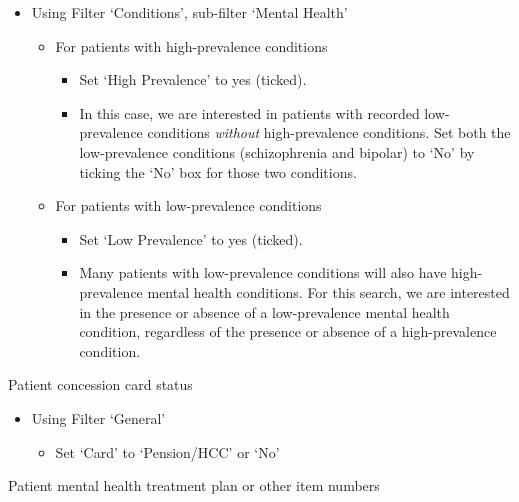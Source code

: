 \documentclass[
  letterpaper,
  DIV=11,
  numbers=noendperiod,
  oneside]{scrartcl}
\providecommand{\tightlist}{%
  \setlength{\itemsep}{0pt}\setlength{\parskip}{0pt}}\usepackage{longtable,booktabs,array}
\begin{document}
\begin{itemize}
\tightlist
\item
  Using Filter `Conditions', sub-filter `Mental Health'

  \begin{itemize}
  \tightlist
  \item
    For patients with high-prevalence conditions

    \begin{itemize}
    \tightlist
    \item
      Set `High Prevalence' to yes (ticked).
    \item
      In this case, we are interested in patients with recorded
      low-prevalence conditions \emph{without} high-prevalence
      conditions. Set both the low-prevalence conditions (schizophrenia
      and bipolar) to `No' by ticking the `No' box for those two
      conditions.
    \end{itemize}
  \item
    For patients with low-prevalence conditions

    \begin{itemize}
    \tightlist
    \item
      Set `Low Prevalence' to yes (ticked).
    \item
      Many patients with low-prevalence conditions will also have
      high-prevalence mental health conditions. For this search, we are
      interested in the presence or absence of a low-prevalence mental
      health condition, regardless of the presence or absence of a
      high-prevalence condition.
    \end{itemize}
  \end{itemize}
\end{itemize}

Patient concession card status

\begin{itemize}
\tightlist
\item
  Using Filter `General'

  \begin{itemize}
  \tightlist
  \item
    Set `Card' to `Pension/HCC' or `No'
  \end{itemize}
\end{itemize}

Patient mental health treatment plan or other item numbers
\end{document}
